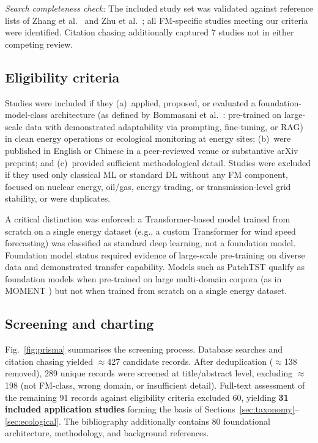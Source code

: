 \documentclass[preprint,12pt]{elsarticle}
\begin{document}
\textit{Search completeness check:} The included study set was validated against reference lists of Zhang et al.\ \cite{zhang2025deep_generative_energy} and Zhu et al.\ \cite{zhu2024generalist_energy_ai}; all FM-specific studies meeting our criteria were identified. Citation chasing additionally captured 7 studies not in either competing review.

\subsection{Eligibility criteria}
\label{subsec:eligibility}

{ Studies were included if they (a)~applied, proposed, or evaluated a foundation-model-class architecture (as defined by Bommasani et al.\ \cite{bommasani2021opportunities}: pre-trained on large-scale data with demonstrated adaptability via prompting, fine-tuning, or RAG) in clean energy operations or ecological monitoring at energy sites; (b)~were published in English or Chinese in a peer-reviewed venue or substantive arXiv preprint; and (c)~provided sufficient methodological detail. Studies were excluded if they used only classical ML or standard DL without any FM component, focused on nuclear energy, oil/gas, energy trading, or transmission-level grid stability, or were duplicates.\par}

A critical distinction was enforced: a Transformer-based model trained from scratch on a single energy dataset (e.g., a custom Transformer for wind speed forecasting) was classified as standard deep learning, not a foundation model. Foundation model status required evidence of large-scale pre-training on diverse data and demonstrated transfer capability. Models such as PatchTST \cite{nie2023patchtst} qualify as foundation models when pre-trained on large multi-domain corpora (as in MOMENT \cite{goswami2024moment}) but not when trained from scratch on a single energy dataset.

\subsection{Screening and charting}
\label{subsec:screening}

Fig.~\ref{fig:prisma} summarises the screening process. Database searches and citation chasing yielded $\approx$427 candidate records. After deduplication ($\approx$138 removed), 289 unique records were screened at title/abstract level, excluding $\approx$198 (not FM-class, wrong domain, or insufficient detail). Full-text assessment of the remaining 91 records against eligibility criteria excluded 60, yielding \textbf{31 included application studies} forming the basis of Sections~\ref{sec:taxonomy}--\ref{sec:ecological}. The bibliography additionally contains 80 foundational architecture, methodology, and background references.
\end{document}
